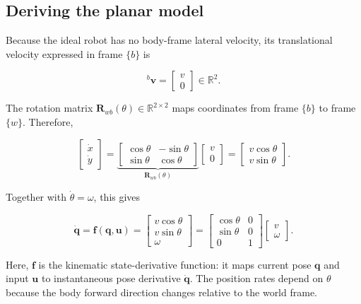 \documentclass[
  australian,
  12pt,
  letterpaper,
  DIV=11,
  numbers=noendperiod,
  twoside]{scrreprt}
\begin{document}
\subsection{Deriving the planar model}\label{deriving-the-planar-model}

Because the ideal robot has no body-frame lateral velocity, its
translational velocity expressed in frame \(\{b\}\) is

\[
{}^{b}\mathbf v
=
\begin{bmatrix}
v\\
0
\end{bmatrix}
\in\mathbb R^2.
\]

The rotation matrix \(\mathbf R_{wb}(\theta)\in\mathbb R^{2\times2}\)
maps coordinates from frame \(\{b\}\) to frame \(\{w\}\). Therefore,

\[
\begin{bmatrix}
\dot x\\
\dot y
\end{bmatrix}
=
\underbrace{
\begin{bmatrix}
\cos\theta&-\sin\theta\\
\sin\theta&\cos\theta
\end{bmatrix}
}_{\mathbf R_{wb}(\theta)}
\begin{bmatrix}
v\\
0
\end{bmatrix}
=
\begin{bmatrix}
v\cos\theta\\
v\sin\theta
\end{bmatrix}.
\]

Together with \(\dot\theta=\omega\), this gives

\[
\boxed{
\dot{\mathbf q}
=
\mathbf f(\mathbf q,\mathbf u)
=
\begin{bmatrix}
v\cos\theta\\
v\sin\theta\\
\omega
\end{bmatrix}
=
\begin{bmatrix}
\cos\theta&0\\
\sin\theta&0\\
0&1
\end{bmatrix}
\begin{bmatrix}
v\\
\omega
\end{bmatrix}
}.
\]

Here, \(\mathbf f\) is the kinematic state-derivative function: it maps
current pose \(\mathbf q\) and input \(\mathbf u\) to instantaneous pose
derivative \(\dot{\mathbf q}\). The position rates depend on \(\theta\)
because the body forward direction changes relative to the world frame.
\end{document}
